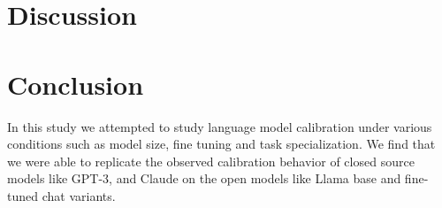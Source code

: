 \documentclass[11pt]{article}
\begin{document}
\FloatBarrier

\section{Discussion}


\section{Conclusion}

In this study we attempted to study language model calibration  under various conditions such as model size, fine tuning and task specialization. We find that we were able to replicate the observed  calibration behavior of closed source models like 
GPT-3, and  Claude on the open models like Llama base and fine-tuned chat variants. 
\end{document}

